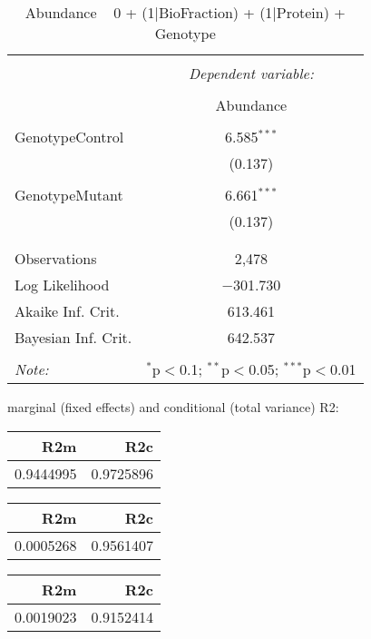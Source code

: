\documentclass[11pt]{report}
\begin{document}
\begin{table}[!htbp] \centering 
  \caption{Abundance ~ 0 + (1|BioFraction) + (1|Protein) + Genotype} 
  \label{} 
\begin{tabular}{@{\extracolsep{5pt}}lc} 
\\[-1.8ex]\hline 
\hline \\[-1.8ex] 
 & \multicolumn{1}{c}{\textit{Dependent variable:}} \\ 
\cline{2-2} 
\\[-1.8ex] & Abundance \\ 
\hline \\[-1.8ex] 
 GenotypeControl & 6.585$^{***}$ \\ 
  & (0.137) \\ 
  & \\ 
 GenotypeMutant & 6.661$^{***}$ \\ 
  & (0.137) \\ 
  & \\ 
\hline \\[-1.8ex] 
Observations & 2,478 \\ 
Log Likelihood & $-$301.730 \\ 
Akaike Inf. Crit. & 613.461 \\ 
Bayesian Inf. Crit. & 642.537 \\ 
\hline 
\hline \\[-1.8ex] 
\textit{Note:}  & \multicolumn{1}{r}{$^{*}$p$<$0.1; $^{**}$p$<$0.05; $^{***}$p$<$0.01} \\ 
\end{tabular} 
\end{table} 
marginal (fixed effects) and conditional (total variance) R2:

\begin{tabular}{r|r}
\hline
R2m & R2c\\
\hline
0.9444995 & 0.9725896\\
\hline
\end{tabular}

\begin{tabular}{r|r}
\hline
R2m & R2c\\
\hline
0.0005268 & 0.9561407\\
\hline
\end{tabular}

\begin{tabular}{r|r}
\hline
R2m & R2c\\
\hline
0.0019023 & 0.9152414\\
\hline
\end{tabular}
\end{document}
